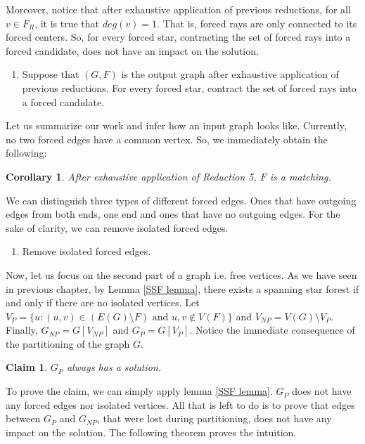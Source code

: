 \documentclass[en]{pracamgr}
\newtheorem{claim}{Claim}
\newtheorem{corollary}{Corollary}
\begin{document}
Moreover, notice that after exhaustive application of previous reductions, for all $v \in F_R$, it is true that $deg(v)=1$. That is, forced rays are only connected to its forced centers. So, for every forced star, contracting the set of forced rays into a forced candidate, does not have an impact on the solution.

\begin{enumerate}[leftmargin=*,label=\textbf{Reduction \arabic{enumi}},resume,wide, labelwidth=!, labelindent=0pt]
	\item Suppose that $(G,F)$ is the output graph after exhaustive application of previous reductions. For every forced star, contract the set of forced rays into a forced candidate.
\end{enumerate}

Let us summarize our work and infer how an input graph looks like. Currently, no two forced edges have a common vertex. So, we immediately obtain the following:

\begin{corollary}
	After exhaustive application of Reduction 5, $F$ is a matching.
\end{corollary}

We can distinguish three types of different forced edges. Ones that have outgoing edges from both ends, one end and ones that have no outgoing edges. For the sake of clarity, we can remove isolated forced edges.

\begin{enumerate}[leftmargin=*,label=\textbf{Reduction \arabic{enumi}},resume,wide, labelwidth=!, labelindent=0pt]
	\item Remove isolated forced edges.
\end{enumerate}

Now, let us focus on the second part of a graph i.e. free vertices. As we have seen in previous chapter, by Lemma \ref{SSF lemma}, there exists a spanning star forest if and only if there are no isolated vertices. Let $V_P = \{u: (u,v) \in (E(G) \setminus F) \text{ and } u,v \notin V(F)\}$ and $V_{NP} = V(G) \setminus V_P$. Finally, $G_{NP} = G[V_{NP}]$ and $G_P = G[V_P]$. Notice the immediate consequence of the partitioning of the graph $G$.

\begin{claim}\label{gp cut}
	$G_P$ always has a solution.
\end{claim}

To prove the claim, we can simply apply lemma \ref{SSF lemma}. $G_P$ does not have any forced edges nor isolated vertices. All that is left to do is to prove that edges between $G_P$ and $G_{NP}$, that were lost during partitioning, does not have any impact on the solution. The following theorem proves the intuition.
\end{document}
